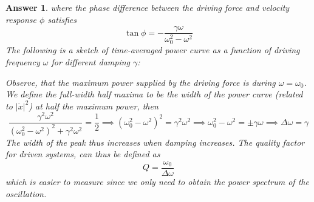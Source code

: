 \documentclass[a4paper]{article}
\newtheorem{ans}{Answer}[subsection]
\theoremstyle{new}
\begin{document}
\begin{ans}
where the phase difference between the driving force and velocity response $\phi$ satisfies $$\tan\phi=-\frac{\gamma\omega}{\omega_0^2-\omega^2}$$
The following is a sketch of time-averaged power curve as a function of driving frequency $\omega$ for different damping $\gamma$:
\begin{center}
\end{center}
Observe, that the maximum power supplied by the driving force is during $\omega=\omega_0$. We define the full-width half maxima to be the width of the power curve (related to $|\dot{x}|^2$) at half the maximum power, then
$$\frac{\gamma^2\omega^2}{(\omega_0^2-\omega^2)^2+\gamma^2\omega^2}=\frac{1}{2}\implies(\omega_0^2-\omega^2)^2=\gamma^2\omega^2\implies\omega_0^2-\omega^2=\pm\gamma\omega\implies\Delta\omega=\gamma$$
The width of the peak thus increases when damping increases. The quality factor for driven systems, can thus be defined as $$Q=\frac{\omega_0}{\Delta\omega}$$
which is easier to measure since we only need to obtain the power spectrum of the oscillation.




\end{ans}
\end{document}
